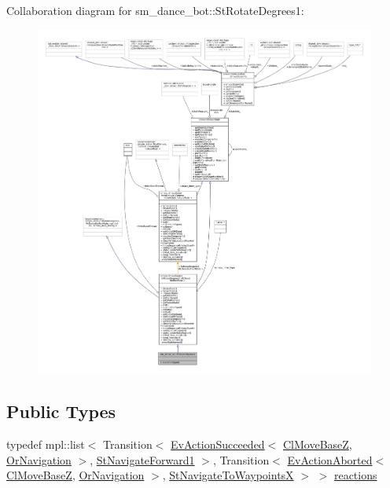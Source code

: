 Collaboration diagram for sm\+\_\+dance\+\_\+bot\+:\+:St\+Rotate\+Degrees1\+:
\nopagebreak
\begin{figure}[H]
\begin{center}
\leavevmode
\includegraphics[width=350pt]{structsm__dance__bot_1_1StRotateDegrees1__coll__graph}
\end{center}
\end{figure}
\subsection*{Public Types}
\begin{DoxyCompactItemize}
\item 
typedef mpl\+::list$<$ Transition$<$ \hyperlink{structsmacc_1_1default__events_1_1EvActionSucceeded}{Ev\+Action\+Succeeded}$<$ \hyperlink{classcl__move__base__z_1_1ClMoveBaseZ}{Cl\+Move\+BaseZ}, \hyperlink{classsm__dance__bot_1_1OrNavigation}{Or\+Navigation} $>$, \hyperlink{structsm__dance__bot_1_1StNavigateForward1}{St\+Navigate\+Forward1} $>$, Transition$<$ \hyperlink{structsmacc_1_1default__events_1_1EvActionAborted}{Ev\+Action\+Aborted}$<$ \hyperlink{classcl__move__base__z_1_1ClMoveBaseZ}{Cl\+Move\+BaseZ}, \hyperlink{classsm__dance__bot_1_1OrNavigation}{Or\+Navigation} $>$, \hyperlink{structsm__dance__bot_1_1StNavigateToWaypointsX}{St\+Navigate\+To\+WaypointsX} $>$ $>$ \hyperlink{structsm__dance__bot_1_1StRotateDegrees1_a58ee8ae33d9526e26e6849a53519effa}{reactions}
\end{DoxyCompactItemize}
